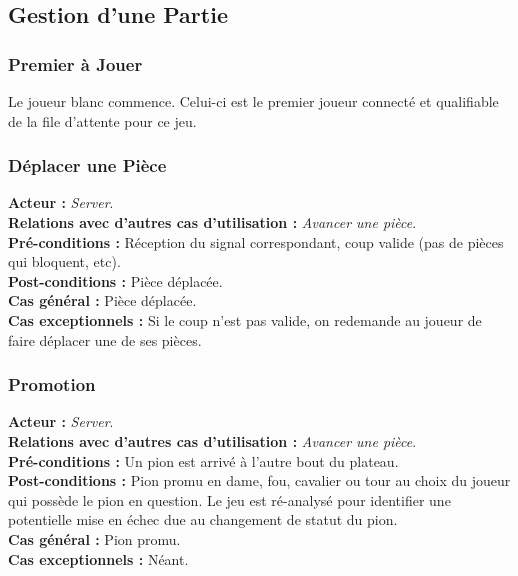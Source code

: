 \documentclass[10pt, a4paper]{article}
\begin{document}
\subsection{Gestion d'une Partie}

\subsubsection{Premier à Jouer}
Le joueur blanc commence. Celui-ci est le premier joueur connecté et qualifiable de la file d'attente pour ce jeu. \\

\subsubsection{Déplacer une Pièce}
\textbf{Acteur :} \textit{Server}. \\
\textbf{Relations avec d'autres cas d'utilisation :} {\itshape Avancer une pièce}. \\
\textbf{Pré-conditions :} Réception du signal correspondant, coup valide (pas de pièces qui bloquent, etc). \\
\textbf{Post-conditions :} Pièce déplacée. \\
\textbf{Cas général :} Pièce déplacée. \\
\textbf{Cas exceptionnels :} Si le coup n'est pas valide, on redemande au joueur de faire déplacer une de ses pièces. \\

\subsubsection{Promotion}
\textbf{Acteur :} \textit{Server}. \\
\textbf{Relations avec d'autres cas d'utilisation :} {\itshape Avancer une pièce}. \\
\textbf{Pré-conditions :} Un pion est arrivé à l'autre bout du plateau. \\
\textbf{Post-conditions :} Pion promu en dame, fou, cavalier ou tour au choix du joueur qui possède le pion en question. Le jeu est ré-analysé pour identifier une potentielle mise en échec due au changement de statut du pion. \\
\textbf{Cas général :} Pion promu. \\
\textbf{Cas exceptionnels :} Néant. \\
\end{document}
